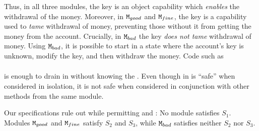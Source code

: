 \begin{example}
{Thus, in all three modules, the key is an object capability which \emph{enables} the withdrawal of the money. 
Moreover, in $\mbox{\normalfont{\texttt{M}}}_{{good}}$ and $\mbox{\normalfont{\texttt{M}}}_{{fine}}$, the key
{is a capability} used to  \emph{tame} withdrawal of money, preventing those without it from getting the money from the account.}
Crucially,  in $\mbox{\normalfont{\texttt{M}}}_{{bad}}$ the key \emph{does not tame} withdrawal of money.
Using $\mbox{\normalfont{\texttt{M}}}_{{bad}}$, it is possible to start in a state where the account's key is unknown, modify the key, and then withdraw the money. 
Code  {such as}
\\ 
$\ \strut \hspace{.2in} $  
\\ 
is enough to drain   in \ModB without knowing the \password.
Even though %
 in  \ModB is ``safe'' when considered in isolation, it is not safe when considered in conjunction with other methods from the same module. 

Our  specifications  rule  out \ModB while permitting \ModA and
\ModC:
No module  satisfies $S_1$. Modules $\mbox{\normalfont{\texttt{M}}}_{{good}}$ and $\mbox{\normalfont{\texttt{M}}}_{{fine}}$ satisfy $S_2$ and $S_3$, while $\mbox{\normalfont{\texttt{M}}}_{{bad}}$ satisfies neither $S_2$ nor $S_3$.
\end{example}
 



